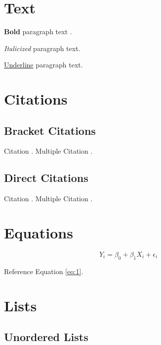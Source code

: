 

\section{Text} \label{section}

\textbf{Bold} paragraph text .

\textit{Italicized} paragraph text.

\underline{Underline} paragraph text.


\section{Citations} \label{citations}

\subsection{Bracket Citations} \label{bracket-citations}

Citation \citep{lastnamep:yearp}. Multiple Citation \citep{lastnamep:yearp,lastnamee:yeare,lastnamea:yeara}.

\subsection{Direct Citations} \label{direct-citations}

Citation \citet{lastnamep:yearp}. Multiple Citation \citet{lastnamep:yearp,lastnamee:yeare,lastnamea:yeara}.


\section{Equations} \label{equations}

\begin{equation}
\label{eq:1}
	Y_i = \beta_0 + \beta_1 X_i + \epsilon_i
\end{equation}

Reference Equation \ref{eq:1}.


\section{Lists} \label{lists}

\subsection{Unordered Lists} \label{unordered-lists}

